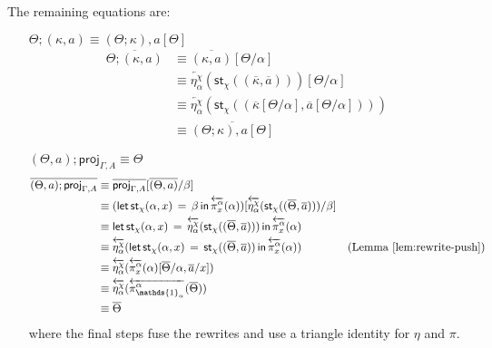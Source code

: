 \documentclass[10pt]{article}
\theoremstyle{definition}
\newcommand{\rewrite}[2]{\overleftarrow{#1}(#2)}
\newcommand\StI[2]{\ensuremath{\mathsf{st}_{#1}(#2)}}
\newcommand\StE[4]{\ensuremath{\mathsf{let} \, \StI{#1}{#3} \, = \, {#2} \, \mathsf{in} \, #4}}
\newcommand{\upstairs}[1]{\overline{#1}}
\newcommand\proj[1]{\ensuremath{\mathsf{proj}_{#1}}}
\newcommand\One{\ensuremath{\mathds{1}}}
\begin{document}
The remaining equations are:

\begin{enumerate}[style = multiline, labelwidth = 80pt]
\item[{$\Theta ; (\kappa , a) \equiv (\Theta ; \kappa) , a[\Theta]$}] 
\begin{align*}
\upstairs{\Theta ; (\kappa , a)}
&\equiv \upstairs{(\kappa, a)}[\Theta/\alpha] \\
&\equiv \rewrite{\eta^\chi_{\alpha}}{\StI{\chi}{(\upstairs{\kappa}, \upstairs{a})}}[\Theta/\alpha] \\
&\equiv \rewrite{\eta^\chi_{\alpha}}{\StI{\chi}{(\upstairs{\kappa}[\Theta/\alpha], \upstairs{a}[\Theta/\alpha])}} \\
&\equiv \upstairs{(\Theta ; \kappa) , a[\Theta]}
\end{align*}

\item[{$(\Theta, a);\proj{\Gamma,A} \equiv \Theta$}]
\begin{align*}
\upstairs{(\Theta, a);\proj{\Gamma,A}}
&\equiv \upstairs{\proj{\Gamma,A}}[\upstairs{(\Theta, a)}/\beta] \\
&\equiv (\StE{\chi}{\beta}{\alpha, x}{\rewrite{\pi^\alpha_x}{\alpha}})[\rewrite{\eta^\chi_{\alpha}}{\StI{\chi}{(\upstairs{\Theta}, \upstairs{a})}}/\beta] \\
&\equiv \StE{\chi}{\rewrite{\eta^\chi_{\alpha}}{\StI{\chi}{(\upstairs{\Theta}, \upstairs{a})}}}{\alpha,x}{\rewrite{\pi^\alpha_x}{\alpha}} \\
&\equiv \rewrite{\eta^\chi_{\alpha}}{\StE{\chi}{\StI{\chi}{(\upstairs{\Theta}, \upstairs{a})}}{\alpha, x}{\rewrite{\pi^\alpha_x}{\alpha}}} & (\text{Lemma}~\ref{lem:rewrite-push})\\
&\equiv \rewrite{\eta^\chi_{\alpha}}{\rewrite{\pi^\alpha_x}{\alpha}[\upstairs{\Theta}/\alpha, \upstairs{a}/x]} \\
&\equiv \rewrite{\eta^\chi_{\alpha}}{\rewrite{\pi^\alpha_{\One_\alpha}}{\upstairs{\Theta}}} \\
&\equiv\upstairs{\Theta} 
\end{align*}
where the final steps fuse the rewrites and use a triangle identity for $\eta$ and $\pi$.  


\end{enumerate}
\end{document}
